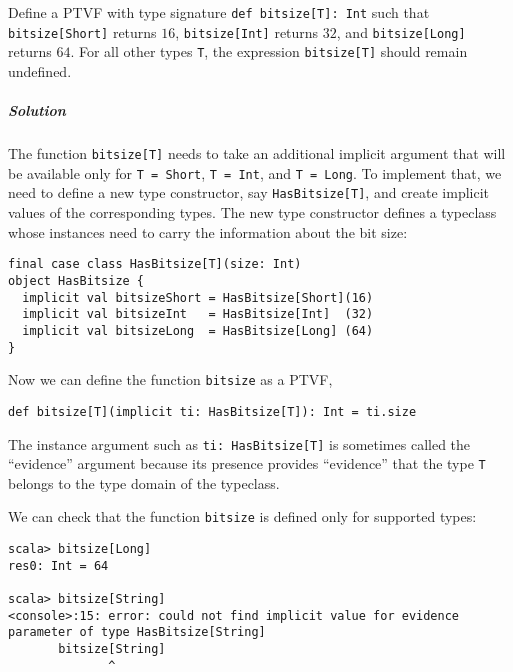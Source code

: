 Define a PTVF with type signature \lstinline!def bitsize[T]: Int!
such that \lstinline!bitsize[Short]! returns $16$, \lstinline!bitsize[Int]!
returns $32$, and \lstinline!bitsize[Long]! returns $64$. For all
other types \lstinline!T!, the expression \lstinline!bitsize[T]!
should remain undefined.

\subparagraph{Solution}

The function \lstinline!bitsize[T]! needs to take an additional implicit
argument that will be available only for \lstinline!T = Short!, \lstinline!T = Int!,
and \lstinline!T = Long!. To implement that, we need to define a
new type constructor, say \lstinline!HasBitsize[T]!, and create implicit
values of the corresponding types. The new type constructor defines
a typeclass whose instances need to carry the information about the
bit size:
\begin{lstlisting}
final case class HasBitsize[T](size: Int)
object HasBitsize {
  implicit val bitsizeShort = HasBitsize[Short](16)
  implicit val bitsizeInt   = HasBitsize[Int]  (32)
  implicit val bitsizeLong  = HasBitsize[Long] (64)
}
\end{lstlisting}
Now we can define the function \lstinline!bitsize! as a PTVF,
\begin{lstlisting}
def bitsize[T](implicit ti: HasBitsize[T]): Int = ti.size
\end{lstlisting}
The instance argument such as \lstinline!ti: HasBitsize[T]! is sometimes
called the \textsf{``}evidence\textsf{''} argument
because its presence provides \textsf{``}evidence\textsf{''} that the type \lstinline!T!
belongs to the type domain of the typeclass.

We can check that the function \lstinline!bitsize! is defined only
for supported types:
\begin{lstlisting}
scala> bitsize[Long]
res0: Int = 64

scala> bitsize[String]
<console>:15: error: could not find implicit value for evidence parameter of type HasBitsize[String]
       bitsize[String]
              ^ 
\end{lstlisting}


